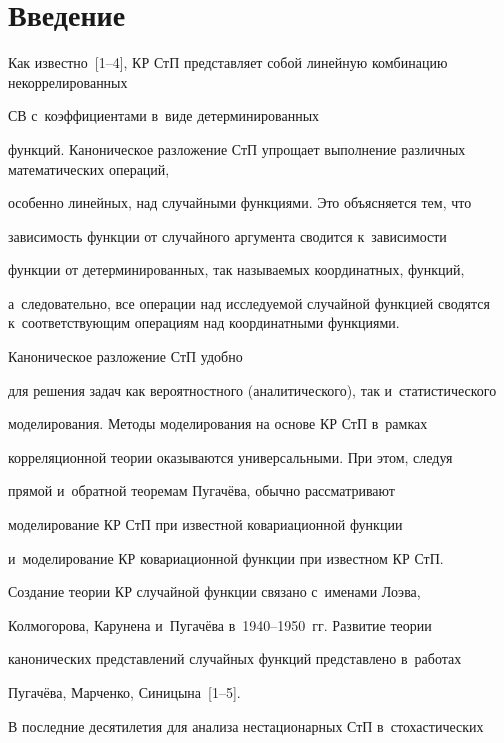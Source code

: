 \section{Введение}





\vspace*{-4pt}





  Как известно~[1--4], КР СтП представляет собой линейную комбинацию некоррелированных 


СВ с~коэффициентами в~виде детерминированных 


функций. Каноническое разложение СтП упрощает выполнение различных математических операций, 


особенно линейных, над случайными функциями. Это объясняется тем, что 


зависимость функции от случайного аргумента сводится к~за\-ви\-си\-мости 


функции от детерминированных, так называемых координатных, функций, 


а~следовательно, все операции над исследуемой случайной функцией сводятся к~соответствующим операциям над координатными функциями. 


Каноническое разложение СтП удобно 


для решения задач как вероятностного (аналитического), так и~статистического 


моделирования. Методы моделирования на основе КР СтП в~рамках 


корреляционной теории оказываются универсальными. При этом, следуя 


прямой и~обратной тео\-ре\-мам Пугачёва, обычно рассматривают 


моделирование КР СтП при известной ковариационной функции 


и~моделирование КР ковариационной функции при известном КР СтП. 


Создание теории КР случайной функции связано с~именами Лоэва, 


Колмогорова, Карунена и~Пугачёва в~1940--1950~гг. Развитие теории 


канонических представлений случайных функций представлено в~работах 


Пугачёва, Марченко, Синицына~[1--5]. 


  


  В последние десятилетия для анализа нестационарных СтП в~стохастических 



